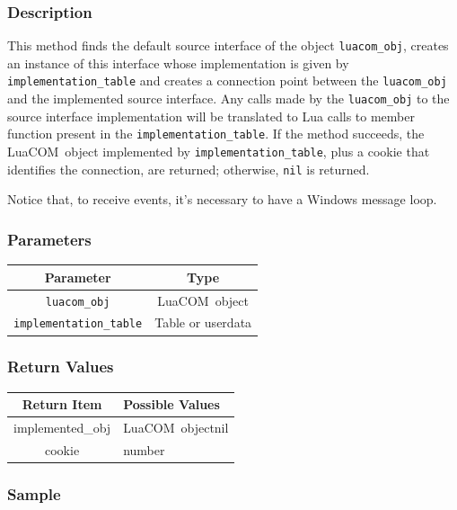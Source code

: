 \documentclass[11pt,a4paper,english]{report}
\newcommand{\techname}[1]{\mbox{#1}}
\newcommand{\luacom}{\techname{LuaCOM}}
\begin{document}
\subsubsection*{Description}
  This method finds the default source interface of the object
  \verb+luacom_obj+, creates an instance of this interface whose
  implementation is given by \verb+implementation_table+ and creates a
  connection point between the \verb+luacom_obj+ and the implemented
  source interface. Any calls made by the \verb+luacom_obj+ to the
  source interface implementation will be translated to Lua calls to
  member function present in the \verb+implementation_table+. If the
  method succeeds, the \luacom\ object implemented by
  \verb+implementation_table+, plus a cookie that identifies the connection, are returned; otherwise, \verb+nil+ is
  returned.

  Notice that, to receive events, it's necessary to have a Windows
  message loop.


\subsubsection*{Parameters}

\begin{tabular}{|c|c|}
\hline
\bf Parameter & \bf Type    \\ \hline \hline
\verb+luacom_obj+ & \luacom\ object     \\ \hline
\verb+implementation_table+ & Table or userdata\\ \hline
\end{tabular}

\subsubsection*{Return Values}

\begin{tabular}{|c|p{4cm}|}
\hline
\bf Return Item & \bf Possible Values \\ \hline \hline
implemented\_obj  & \luacom\ object\newline nil \\ \hline
cookie & number \\ \hline
\end{tabular}

\subsubsection*{Sample}
\end{document}
